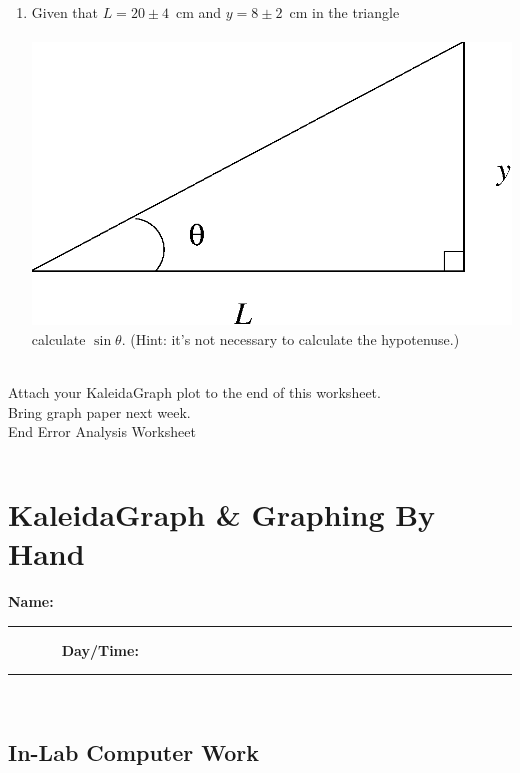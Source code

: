 \begin{enumerate}
\item Given that $L=20\pm 4$~cm and $y=8\pm 2$~cm in the triangle\\
\vspace*{2mm}\\
\hspace*{4cm} \epsfxsize=5cm \includegraphics[scale=0.5]{0_intro/triangle.eps}\\
calculate $\sin\theta$. (Hint: it's not necessary to calculate the hypotenuse.)\\
\vspace*{3cm} \\
\end{enumerate}
\vfill
\noindent Attach your KaleidaGraph plot to the end of this worksheet. \\
{\Large Bring graph paper next week.} \\
{\Large End Error Analysis Worksheet}


\pagebreak
$$
$$
\vfill
\clearpage
\newpage

\renewcommand{\thesection}{\thechapter.W2}

\section{KaleidaGraph \& Graphing By Hand}
{\bf \Large Name:}~ \rule{5cm}{.1mm}~~~~~~~
{\bf \Large Day/Time:}~\rule{3cm}{.1mm}\\
\label{sec:ea:graph}
\subsection{In-Lab Computer Work}
